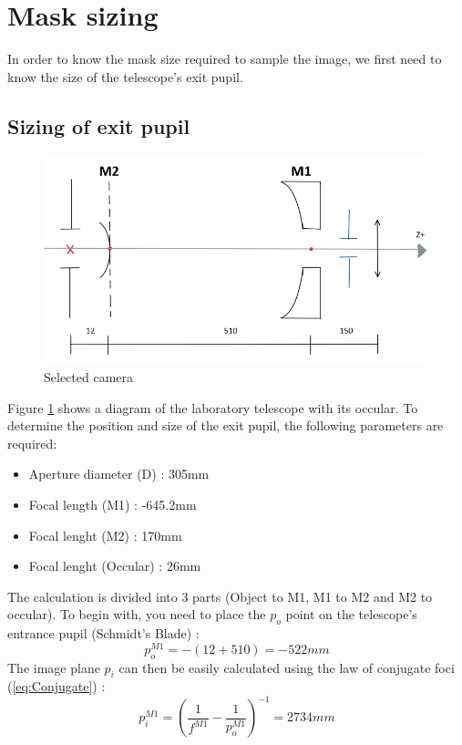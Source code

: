 \section{Mask sizing}\label{sec:Opti_Couille}
In order to know the mask size required to sample the image, we first need to know the size of the telescope's exit pupil.
\subsection{Sizing of exit pupil}
\begin{figure}[H]
    \centering
    \includegraphics[scale=0.9]{assets/figures/Optical Design/Design_Mask.png}
    \caption{Selected camera}
    \label{fig:Opti_Mask_Diagram}
\end{figure}
Figure \ref{fig:Opti_Mask_Diagram} shows a diagram of the laboratory telescope with its occular.
To determine the position and size of the exit pupil, the following parameters are required:
\begin{itemize}
    \item Aperture diameter (D) : 305mm
    \item Focal length (M1) : -645.2mm
    \item Focal lenght (M2) : 170mm
    \item Focal lenght (Occular) : 26mm
\end{itemize}
The calculation is divided into 3 parts (Object to M1, M1 to M2 and M2 to occular).
To begin with, you need to place the $p_o$ point on the telescope's entrance pupil (Schmidt's Blade) :
\begin{equation}
    p_o^{M1} = -(12+510) = -522mm
\end{equation}
The image plane $p_i$ can then be easily calculated using the law of conjugate foci (\ref{eq:Conjugate}) :
\begin{equation}
    p_i^{M1} = \left(\frac{1}{f^{M1}}-\frac{1}{p_o^{M1}}\right)^{-1} = 2734 mm
\end{equation}
